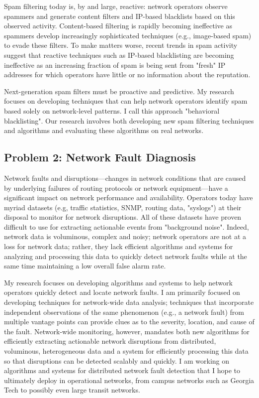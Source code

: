 Spam filtering today is, by and large, reactive: network operators
observe spammers and generate content filters and IP-based blacklists
based on this observed activity.  Content-based filtering is rapidly
becoming ineffective as spammers develop increasingly sophisticated
techniques (e.g., image-based spam) to evade these filters.  To make
matters worse, recent trends in spam activity suggest that reactive
techniques such as IP-based blacklisting are becoming ineffective as an
increasing fraction of spam is being sent from "fresh" IP addresses for
which operators have little or no information about the reputation.

Next-generation spam filters must be proactive and predictive.  My
research focuses on developing techniques that can help network
operators identify spam based solely on network-level patterns.  I call
this approach "behavioral blacklisting".  Our research involves both
developing new spam filtering techniques and algorithms and evaluating
these algorithms on real networks.

\subsection*{Problem 2: Network Fault Diagnosis}

Network faults and disruptions---changes in network conditions that are
caused by underlying failures of routing protocols or network
equipment---have a significant impact on network performance and
availability.  Operators today have myriad datasets (e.g, traffic
statistics, SNMP, routing data, "syslogs") at their disposal to monitor
for network disruptions.  All of these datasets have proven difficult to
use for extracting actionable events from "background noise".  Indeed,
network data is voluminous, complex and noisy; network operators are not
at a loss for network data; rather, they lack efficient algorithms and
systems for analyzing and processing this data to quickly detect network
faults while at the same time maintaining a low overall false alarm
rate.

My research focuses on developing algorithms and systems to help network
operators quickly detect and locate network faults.  I am primarily
focused on developing techniques for network-wide data analysis;
techniques that incorporate independent observations of the same
phenomenon (e.g., a network fault) from multiple vantage points can
provide clues as to the severity, location, and cause of the fault.
Network-wide monitoring, however, mandates both new algorithms for
efficiently extracting actionable network disruptions from distributed,
voluminous, heterogeneous data and a system for efficiently processing
this data so that disruptions can be detected scalably and quickly.  I
am working on algorithms and systems for distributed network fault
detection that I hope to ultimately deploy in operational networks, from
campus networks such as Georgia Tech to possibly even large transit
networks.


